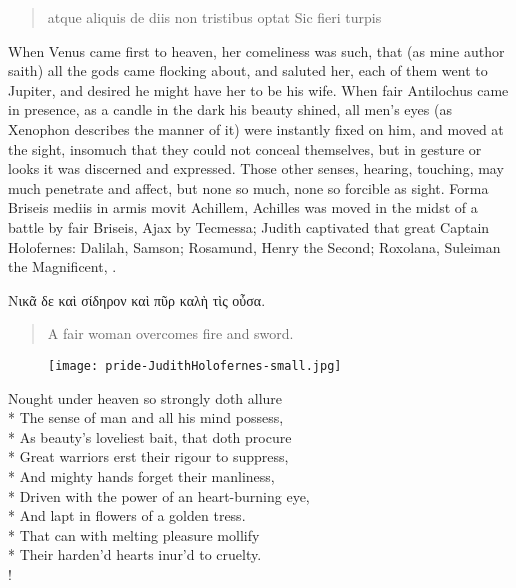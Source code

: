 \begin{latin}
\begin{verse}%
atque aliquis de diis non tristibus optat
Sic fieri turpis
\end{verse}%
\end{latin}

When Venus came first to heaven, her comeliness was such, that (as mine
author saith) all the gods came flocking about, and saluted her,
each of them went to Jupiter, and desired he might have her to be his
wife. When fair Antilochus came in presence, as a candle in the
dark his beauty shined, all men's eyes (as Xenophon describes the
manner of it) were instantly fixed on him, and moved at the sight,
insomuch that they could not conceal themselves, but in gesture or
looks it was discerned and expressed. Those other senses, hearing,
touching, may much penetrate and affect, but none so much, none so
forcible as sight. Forma Briseis mediis in armis movit Achillem,
Achilles was moved in the midst of a battle by fair Briseis, Ajax by
Tecmessa; Judith captivated that great Captain Holofernes: Dalilah,
Samson; Rosamund, Henry the Second; Roxolana, Suleiman the
Magnificent, \etc{}.

\begin{greek}
Νικᾶ δε καὶ σίδηρον καὶ πῦρ καλὴ τὶς οὖσα.
\end{greek}
\translationrule%
\begin{verse}%
A fair woman overcomes fire and sword.
\end{verse}%

\begin{figure}[tbh]
  \begingroup
  \centering
  \texttt{[image: pride-JudithHolofernes-small.jpg]}
  \label{fig:judithholofernes}
\end{figure}

\begin{versewithlinenos}{2}{1}{1}
Nought under heaven so strongly doth allure\\*
The sense of man and all his mind possess,\\*
As beauty's loveliest bait, that doth procure\\*
Great warriors erst their rigour to suppress,\\*
And mighty hands forget their manliness,\\*
Driven with the power of an heart-burning eye,\\*
And lapt in flowers of a golden tress.\\*
That can with melting pleasure mollify\\*
Their harden'd hearts inur'd to cruelty.\\!
\end{versewithlinenos}%

